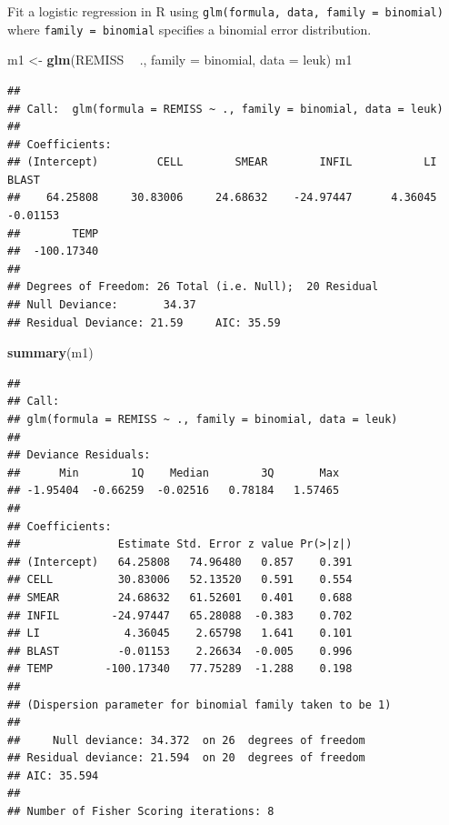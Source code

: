 \documentclass[
]{book}
\newenvironment{Shaded}{\begin{snugshade}}{\end{snugshade}}
\newcommand{\DataTypeTok}[1]{\textcolor[rgb]{0.13,0.29,0.53}{#1}}
\newcommand{\KeywordTok}[1]{\textcolor[rgb]{0.13,0.29,0.53}{\textbf{#1}}}
\newcommand{\NormalTok}[1]{#1}
\newcommand{\OperatorTok}[1]{\textcolor[rgb]{0.81,0.36,0.00}{\textbf{#1}}}
\newcommand{\StringTok}[1]{\textcolor[rgb]{0.31,0.60,0.02}{#1}}
\begin{document}
Fit a logistic regression in R using \texttt{glm(formula,\ data,\ family\ =\ binomial)} where \texttt{family\ =\ binomial} specifies a binomial error distribution.

\begin{Shaded}
\begin{Highlighting}[]
\NormalTok{m1 <-}\StringTok{ }\KeywordTok{glm}\NormalTok{(REMISS }\OperatorTok{~}\StringTok{ }\NormalTok{., }\DataTypeTok{family =}\NormalTok{ binomial, }\DataTypeTok{data =}\NormalTok{ leuk)}
\NormalTok{m1}
\end{Highlighting}
\end{Shaded}

\begin{verbatim}
## 
## Call:  glm(formula = REMISS ~ ., family = binomial, data = leuk)
## 
## Coefficients:
## (Intercept)         CELL        SMEAR        INFIL           LI        BLAST  
##    64.25808     30.83006     24.68632    -24.97447      4.36045     -0.01153  
##        TEMP  
##  -100.17340  
## 
## Degrees of Freedom: 26 Total (i.e. Null);  20 Residual
## Null Deviance:       34.37 
## Residual Deviance: 21.59     AIC: 35.59
\end{verbatim}

\begin{Shaded}
\begin{Highlighting}[]
\KeywordTok{summary}\NormalTok{(m1)}
\end{Highlighting}
\end{Shaded}

\begin{verbatim}
## 
## Call:
## glm(formula = REMISS ~ ., family = binomial, data = leuk)
## 
## Deviance Residuals: 
##      Min        1Q    Median        3Q       Max  
## -1.95404  -0.66259  -0.02516   0.78184   1.57465  
## 
## Coefficients:
##               Estimate Std. Error z value Pr(>|z|)
## (Intercept)   64.25808   74.96480   0.857    0.391
## CELL          30.83006   52.13520   0.591    0.554
## SMEAR         24.68632   61.52601   0.401    0.688
## INFIL        -24.97447   65.28088  -0.383    0.702
## LI             4.36045    2.65798   1.641    0.101
## BLAST         -0.01153    2.26634  -0.005    0.996
## TEMP        -100.17340   77.75289  -1.288    0.198
## 
## (Dispersion parameter for binomial family taken to be 1)
## 
##     Null deviance: 34.372  on 26  degrees of freedom
## Residual deviance: 21.594  on 20  degrees of freedom
## AIC: 35.594
## 
## Number of Fisher Scoring iterations: 8
\end{verbatim}
\end{document}
